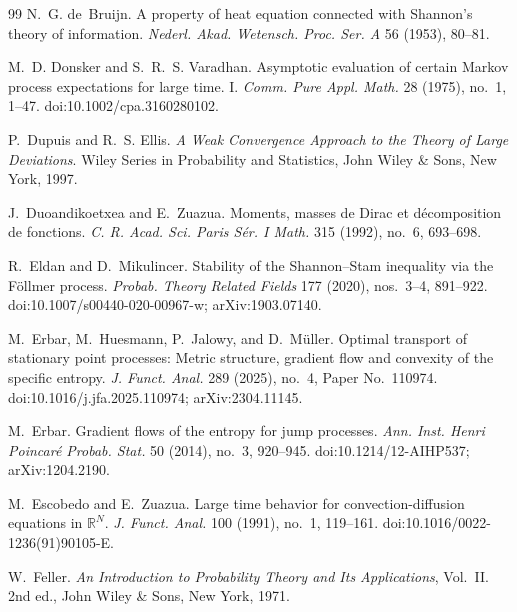 \begin{thebibliography}{99}
N.~G. de~Bruijn.
\newblock A property of heat equation connected with Shannon's theory of
information.
\newblock \emph{Nederl. Akad. Wetensch. Proc. Ser. A} 56 (1953), 80--81.

M.~D. Donsker and S.~R.~S. Varadhan.
\newblock Asymptotic evaluation of certain {M}arkov process expectations for
large time. {I}.
\newblock \emph{Comm. Pure Appl. Math.} 28 (1975), no.~1, 1--47.
\newblock doi:10.1002/cpa.3160280102.

P.~Dupuis and R.~S. Ellis.
\newblock \emph{A Weak Convergence Approach to the Theory of Large
Deviations}.
\newblock Wiley Series in Probability and Statistics, John Wiley \& Sons,
New York, 1997.

J.~Duoandikoetxea and E.~Zuazua.
\newblock Moments, masses de Dirac et d{\'e}composition de fonctions.
\newblock \emph{C. R. Acad. Sci. Paris S{\'e}r. I Math.} 315 (1992),
no.~6, 693--698.

R.~Eldan and D.~Mikulincer.
\newblock Stability of the Shannon--Stam inequality via the F{\"o}llmer
process.
\newblock \emph{Probab. Theory Related Fields} 177 (2020), nos.~3--4,
891--922.
\newblock doi:10.1007/s00440-020-00967-w; arXiv:1903.07140.

M.~Erbar, M.~Huesmann, P.~Jalowy, and D.~M{\"u}ller.
\newblock Optimal transport of stationary point processes: Metric structure,
gradient flow and convexity of the specific entropy.
\newblock \emph{J. Funct. Anal.} 289 (2025), no.~4, Paper No.~110974.
\newblock doi:10.1016/j.jfa.2025.110974; arXiv:2304.11145.

M.~Erbar.
\newblock Gradient flows of the entropy for jump processes.
\newblock \emph{Ann. Inst. Henri Poincar{\'e} Probab. Stat.} 50 (2014),
no.~3, 920--945.
\newblock doi:10.1214/12-AIHP537; arXiv:1204.2190.

M.~Escobedo and E.~Zuazua.
\newblock Large time behavior for convection-diffusion equations in
{$\mathbb R^N$}.
\newblock \emph{J. Funct. Anal.} 100 (1991), no.~1, 119--161.
\newblock doi:10.1016/0022-1236(91)90105-E.

W.~Feller.
\newblock \emph{An Introduction to Probability Theory and Its Applications},
Vol.~II.
\newblock 2nd ed., John Wiley \& Sons, New York, 1971.


\end{thebibliography}
